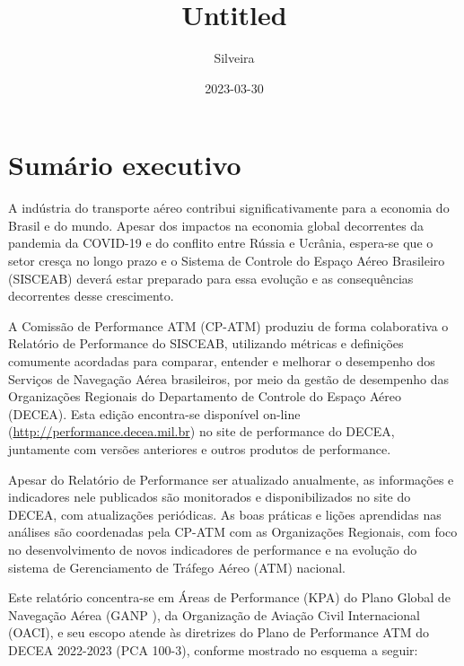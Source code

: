 \documentclass[
]{book}
\title{Untitled}
\author{Silveira}
\date{2023-03-30}
\theoremstyle{definition}
\theoremstyle{definition}
\theoremstyle{definition}
\theoremstyle{definition}
\theoremstyle{remark}
\begin{document}
\maketitle

{
\setcounter{tocdepth}{1}
\tableofcontents
}
\hypertarget{sumuxe1rio-executivo}{%
\chapter{Sumário executivo}\label{sumuxe1rio-executivo}}

A indústria do transporte aéreo contribui significativamente para a economia do Brasil e do mundo. Apesar dos impactos na economia global decorrentes da pandemia da COVID-19 e do conflito entre Rússia e Ucrânia, espera-se que o setor cresça no longo prazo e o Sistema de Controle do Espaço Aéreo Brasileiro (SISCEAB) deverá estar preparado para essa evolução e as consequências decorrentes desse crescimento.

A Comissão de Performance ATM (CP-ATM) produziu de forma colaborativa o Relatório de Performance do SISCEAB, utilizando métricas e definições comumente acordadas para comparar, entender e melhorar o desempenho dos Serviços de Navegação Aérea brasileiros, por meio da gestão de desempenho das Organizações Regionais do Departamento de Controle do Espaço Aéreo (DECEA). Esta edição encontra-se disponível on-line (\url{http://performance.decea.mil.br}) no site de performance do DECEA, juntamente com versões anteriores e outros produtos de performance.

Apesar do Relatório de Performance ser atualizado anualmente, as informações e indicadores nele publicados são monitorados e disponibilizados no site do DECEA, com atualizações periódicas. As boas práticas e lições aprendidas nas análises são coordenadas pela CP-ATM com as Organizações Regionais, com foco no desenvolvimento de novos indicadores de performance e na evolução do sistema de Gerenciamento de Tráfego Aéreo (ATM) nacional.

Este relatório concentra-se em Áreas de Performance (KPA) do Plano Global de Navegação Aérea (GANP ), da Organização de Aviação Civil Internacional (OACI), e seu escopo atende às diretrizes do Plano de Performance ATM do DECEA 2022-2023 (PCA 100-3), conforme mostrado no esquema a seguir:
\end{document}
